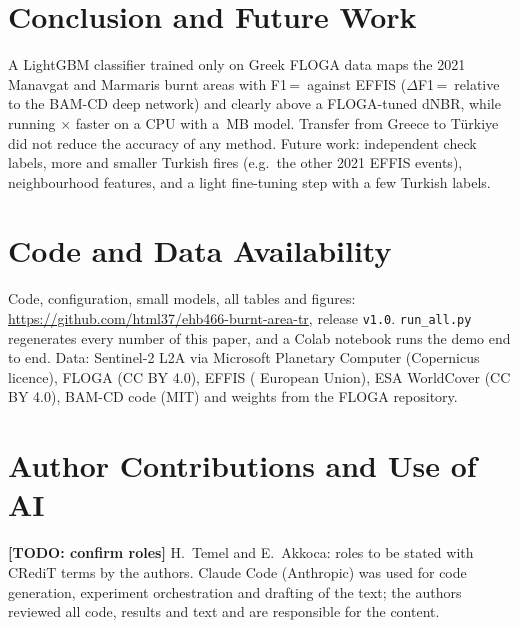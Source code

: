 \section{Conclusion and Future Work}\label{sec:conclusion}
A LightGBM classifier trained only on Greek FLOGA data maps the 2021 Manavgat and Marmaris burnt areas with
F1\,=\,\FoneLgbmPooled{} against EFFIS ($\Delta$F1\,=\,\DeltaLgbmBamcdOnePooled{} relative to the BAM-CD deep
network) and clearly above
a FLOGA-tuned dNBR, while running \SpeedupCpuLgbmBamcd$\times$ faster on a CPU with a \ModelMBLgbm\,MB model. Transfer
from Greece to Türkiye did not reduce the accuracy of any method. Future work: independent check labels,
more and smaller Turkish fires (e.g.\ the other 2021 EFFIS events), neighbourhood features, and a light
fine-tuning step with a few Turkish labels.

\section*{Code and Data Availability}
Code, configuration, small models, all tables and figures: \url{https://github.com/html37/ehb466-burnt-area-tr},
release \texttt{v1.0}. \texttt{run\_all.py} regenerates every number of this paper, and a Colab notebook runs the
demo end to end. Data: Sentinel-2 L2A via Microsoft Planetary Computer (Copernicus licence), FLOGA (CC BY 4.0),
EFFIS (\textcopyright{} European Union), ESA WorldCover (CC BY 4.0), BAM-CD code (MIT) and weights from the FLOGA
repository.

\section*{Author Contributions and Use of AI}
\textbf{[TODO: confirm roles]} H.~Temel and E.~Akkoca: roles to be stated with CRediT terms by the authors.
Claude Code (Anthropic) was used for code generation, experiment orchestration and drafting of the text; the
authors reviewed all code, results and text and are responsible for the content.
